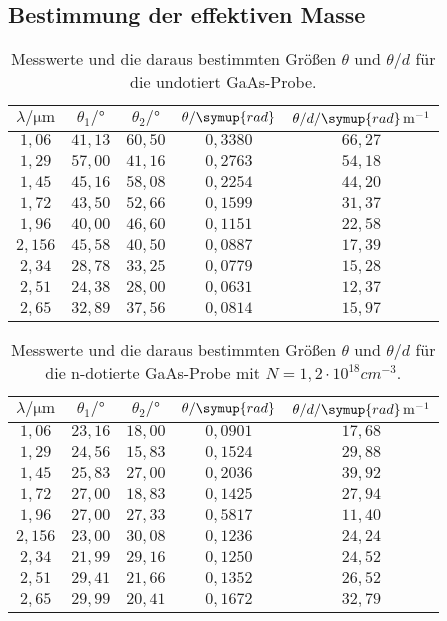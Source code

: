 \subsection{Bestimmung der effektiven Masse}
\begin{table}
  \centering
  \caption{Messwerte und die daraus bestimmten Größen $\theta$ und $\theta/d$ für die undotiert GaAs-Probe.}
  \begin{tabular}{c c c c c}
    \toprule
    $\lambda/\si{\micro\meter}$ & $\theta_{1}/\si{\degree}$ & $\theta_{2}/\si{\degree}$ & $\theta/\symup{rad}$ & $\theta/d/\symup{rad}\, \si{m}^{-1}$\\
    \midrule
    $1,06 $ & $41,13$ & $60,50$ & $0,3380$ & $66,27$ \\
    $1,29 $ & $57,00$ & $41,16$ & $0,2763$ & $54,18$ \\
    $1,45 $ & $45,16$ & $58,08$ & $0,2254$ & $44,20$ \\
    $1,72 $ & $43,50$ & $52,66$ & $0,1599$ & $31,37$ \\
    $1,96 $ & $40,00$ & $46,60$ & $0,1151$ & $22,58$ \\
    $2,156$ & $45,58$ & $40,50$ & $0,0887$ & $17,39$ \\
    $2,34 $ & $28,78$ & $33,25$ & $0,0779$ & $15,28$ \\
    $2,51 $ & $24,38$ & $28,00$ & $0,0631$ & $12,37$ \\
    $2,65 $ & $32,89$ & $37,56$ & $0,0814$ & $15,97$ \\
    \bottomrule
  \end{tabular}
\end{table}

\begin{table}
  \centering
  \caption{Messwerte und die daraus bestimmten Größen $\theta$ und $\theta/d$ für die n-dotierte GaAs-Probe
  mit $N=1,2 \cdot 10^{18} \si{cm}^{-3}$.}
  \begin{tabular}{c c c c c}
    \toprule
    $\lambda/\si{\micro\meter}$ & $\theta_{1}/\si{\degree}$ & $\theta_{2}/\si{\degree}$ & $\theta/\symup{rad}$ & $\theta/d/\symup{rad}\, \si{m}^{-1}$\\
    \midrule
    $1,06 $ & $23,16$ & $18,00$ & $0,0901$ & $17,68$ \\
    $1,29 $ & $24,56$ & $15,83$ & $0,1524$ & $29,88$ \\
    $1,45 $ & $25,83$ & $27,00$ & $0,2036$ & $39,92$ \\
    $1,72 $ & $27,00$ & $18,83$ & $0,1425$ & $27,94$ \\
    $1,96 $ & $27,00$ & $27,33$ & $0,5817$ & $11,40$ \\
    $2,156$ & $23,00$ & $30,08$ & $0,1236$ & $24,24$ \\
    $2,34 $ & $21,99$ & $29,16$ & $0,1250$ & $24,52$ \\
    $2,51 $ & $29,41$ & $21,66$ & $0,1352$ & $26,52$ \\
    $2,65 $ & $29,99$ & $20,41$ & $0,1672$ & $32,79$ \\
    \bottomrule
  \end{tabular}
\end{table}

